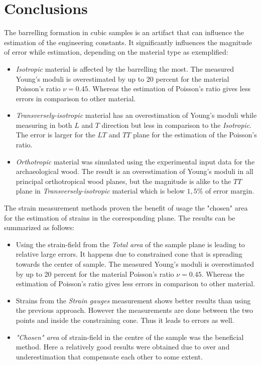 \documentclass[review]{elsarticle}
\begin{document}
\section{Conclusions}

The barrelling formation in cubic samples is an artifact that can influence the
estimation of the engineering constants. It significantly influences the
magnitude of error while estimation, depending on the material type as
exemplified:

\begin{itemize}
  \item \textit{Isotropic} material is affected by the barrelling the most.
  The measured Young's moduli is overestimated by up to 20 percent for the
  material Poisson's ratio $\nu=0.45$. Whereas the estimation of Poisson's ratio
  gives less errors in comparison to other material.
  \item \textit{Transversely-isotropic} material has an overestimation of Young's moduli while measuring in both $L$ and $T$ direction but less in comparison to the \textit{Isotropic}. The error is larger for the $LT$  and $TT$ plane for the estimation of the Poisson's ratio. 
  \item \textit{Orthotropic} material was simulated using the experimental input data for the archaeological wood. The result is an overestimation of Young's moduli in all principal orthotropical wood planes, but the magnitude is alike to the $TT$ plane in \textit{Transversely-isotropic} material which is below $1,5\%$ of error margin.
\end{itemize}

The strain measurement methods proven the benefit of usage the "chosen" area for the estimation of strains in the corresponding plane. The results can be summarized as follows: 

\begin{itemize}
  \item Using the strain-field from the \textit{Total area} of the sample plane is leading to relative large errors. It happens due to constrained cone that is spreading towards the center  of sample.  
  The measured Young's moduli is overestimated by up to 20 percent for the
  material Poisson's ratio $\nu=0.45$. Whereas the estimation of Poisson's ratio
  gives less errors in comparison to other material.
  \item Strains from the \textit{Strain gauges} measurement shows better results than using the previous approach. However the measurements are done between the two points and inside the constraining cone. Thus it leads to errors as well.
  \item  \textit{"Chosen" area} of strain-field in the centre of the sample was the beneficial method. Here a relatively good results were obtained due to over and underestimation that compensate each other to some extent.
\end{itemize}
\end{document}
